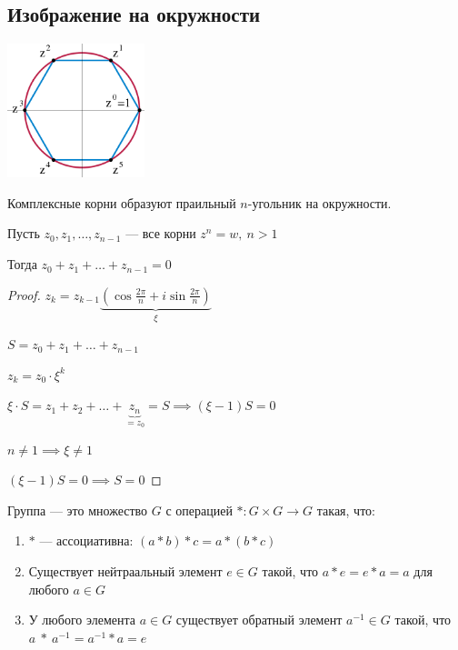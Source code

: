 \begin{normalsize}
\begin{theorem}
\begin{enumerate}
    \end{enumerate}
\end{theorem}

\subsection*{Изображение на окружности}

\begin{center}
    \includegraphics[width=0.3\textwidth]{images/complexroot.png}
\end{center}

Комплексные корни образуют праильный $n$-угольник на окружности.

\begin{lemma}
    Пусть $z_0, z_1, \ldots, z_{n - 1}$ --- все корни $z^n = w,~n > 1$

    Тогда $z_0 + z_1 + \ldots + z_{n - 1} = 0$
\end{lemma}

\begin{proof}

    $z_k = z_{k - 1} \underbrace{\left( \cos \frac{2 \pi}{n} + i \sin \frac{2 \pi}{n} \right)}_{\xi}$

    $S = z_0 + z_1 + \ldots + z_{n - 1}$

    $z_k = z_0 \cdot \xi^k$

    $\xi \cdot S = z_1 + z_2 + \ldots + \underbrace{z_n}_{= z_0} = S \implies (\xi - 1) S = 0$

    $n \neq 1 \implies \xi \neq 1$ 
    
    $(\xi - 1)S = 0 \implies S = 0$
\end{proof}

\begin{defn}
    Группа --- это множество $G$ с операцией $*: G \times G \to G$ такая, что:
    
    \begin{enumerate}
        \item $*$ --- ассоциативна: $(a * b) * c = a * (b * c)$
        \item Существует нейтраальный элемент $e \in G$ такой, что $a * e = e * a = a$ для любого $a \in G$
        \item У любого элемента $a \in G$ существует обратный элемент $a^{-1} \in G$ такой, что $a~*~a^{-1} = a^{-1} * a = e$
    \end{enumerate}
\end{defn}


\end{normalsize}
